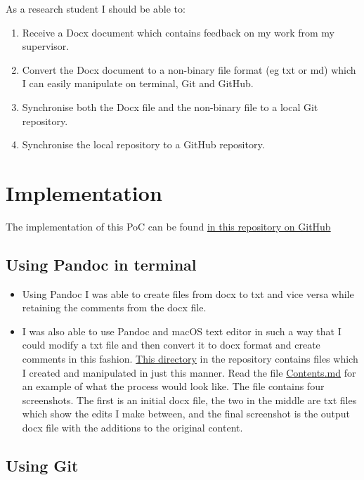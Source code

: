 \documentclass{article}
\begin{document}
As a research student I should be able to:

\begin{enumerate}
    \item Receive a Docx document which contains feedback on my work from my supervisor.
    \item Convert the Docx document to a non-binary file format (eg txt or md) which I can easily manipulate on terminal, Git and GitHub.
    \item Synchronise both the Docx file and the non-binary file to a local Git repository.
    \item Synchronise the local repository to a GitHub repository.
\end{enumerate}

\section{Implementation}

The implementation of this PoC can be found \href{https://github.com/MQ-FOAR705/Version-Control-Supervisor-Feedback-PoC}{in this repository on GitHub}

\subsection{Using Pandoc in terminal}

\begin{itemize}
    \item Using Pandoc I was able to create files from docx to txt and vice versa while retaining the comments from the docx file.
    \item I was also able to use Pandoc and macOS text editor in such a way that I could modify a txt file and then convert it to docx format and create comments in this fashion. \href{https://github.com/MQ-FOAR705/Version-Control-Supervisor-Feedback-PoC/tree/master/aa}{This directory} in the repository contains files which I created and manipulated in just this manner. Read the file \href{https://github.com/MQ-FOAR705/Version-Control-Supervisor-Feedback-PoC/blob/master/aa/Contents.md}{Contents.md} for an example of what the process would look like. The file contains four screenshots. The first is an initial docx file, the two in the middle are txt files which show the edits I make between, and the final screenshot is the output docx file with the additions to the original content.
\end{itemize}

\subsection{Using Git}
\end{document}
